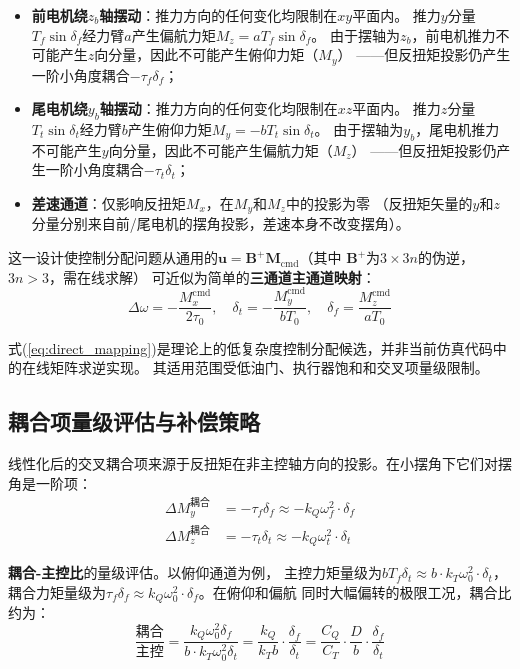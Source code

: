\begin{itemize}
    \item \textbf{前电机绕$z_b$轴摆动}：推力方向的任何变化均限制在$xy$平面内。
          推力$y$分量$T_f \sin\delta_f$经力臂$a$产生偏航力矩$M_z = a T_f \sin\delta_f$。
          由于摆轴为$z_b$，前电机推力不可能产生$z$向分量，因此不可能产生俯仰力矩（$M_y$）
          ——但反扭矩投影仍产生一阶小角度耦合$-\tau_f\delta_f$；
    \item \textbf{尾电机绕$y_b$轴摆动}：推力方向的任何变化均限制在$xz$平面内。
          推力$z$分量$T_t\sin\delta_t$经力臂$b$产生俯仰力矩$M_y = -b T_t\sin\delta_t$。
          由于摆轴为$y_b$，尾电机推力不可能产生$y$向分量，因此不可能产生偏航力矩（$M_z$）
          ——但反扭矩投影仍产生一阶小角度耦合$-\tau_t\delta_t$；
    \item \textbf{差速通道}：仅影响反扭矩$M_x$，在$M_y$和$M_z$中的投影为零
          （反扭矩矢量的$y$和$z$分量分别来自前/尾电机的摆角投影，差速本身不改变摆角）。
\end{itemize}

这一设计使控制分配问题从通用的$\bm{u} = \bm{B}^+ \bm{M}_{\text{cmd}}$（其中
$\bm{B}^+$为$3 \times 3n$的伪逆，$3n > 3$，需在线求解）
可近似为简单的\textbf{三通道主通道映射}：
\begin{equation}
    \Delta\omega = -\frac{M_x^{\text{cmd}}}{2\tau_0}, \quad
    \delta_t = -\frac{M_y^{\text{cmd}}}{b T_0}, \quad
    \delta_f = \frac{M_z^{\text{cmd}}}{a T_0}
    \label{eq:direct_mapping}
\end{equation}

式(\ref{eq:direct_mapping})是理论上的低复杂度控制分配候选，并非当前仿真代码中的在线矩阵求逆实现。
其适用范围受低油门、执行器饱和和交叉项量级限制\cite{johansen2013control,oppenheimer2010control}。

\subsection{耦合项量级评估与补偿策略}

线性化后的交叉耦合项来源于反扭矩在非主控轴方向的投影。在小摆角下它们对摆角是一阶项：
\begin{align}
    \Delta M_y^{\text{耦合}} &= -\tau_f \delta_f
    \approx -k_Q \omega_f^2 \cdot \delta_f
    \label{eq:coupling_pitch} \\
    \Delta M_z^{\text{耦合}} &= -\tau_t \delta_t
    \approx -k_Q \omega_t^2 \cdot \delta_t
    \label{eq:coupling_yaw}
\end{align}

\textbf{耦合-主控比}的量级评估。以俯仰通道为例，
主控力矩量级为$b T_f \delta_t \approx b \cdot k_T \omega_0^2 \cdot \delta_t$，
耦合力矩量级为$\tau_f \delta_f \approx k_Q \omega_0^2 \cdot \delta_f$。在俯仰和偏航
同时大幅偏转的极限工况，耦合比约为：
\begin{equation}
    \frac{\text{耦合}}{\text{主控}}
    = \frac{k_Q \omega_0^2 \delta_f}{b \cdot k_T \omega_0^2 \delta_t}
    = \frac{k_Q}{k_T b} \cdot \frac{\delta_f}{\delta_t}
    = \frac{C_Q}{C_T} \cdot \frac{D}{b} \cdot \frac{\delta_f}{\delta_t}
    \label{eq:coupling_ratio}
\end{equation}

